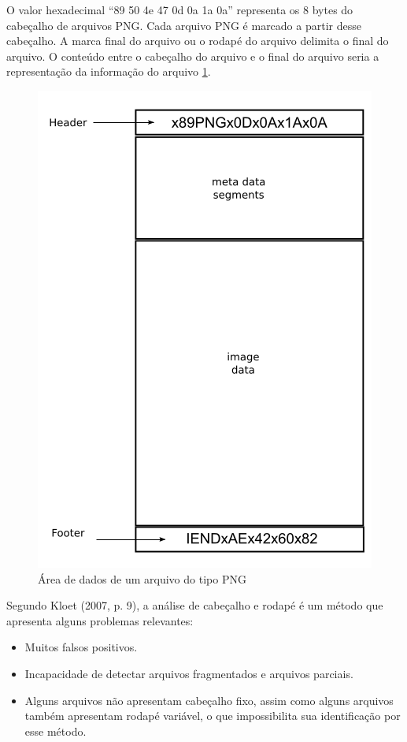 O valor hexadecimal ``89  50  4e  47  0d  0a  1a  0a'' representa os 8 bytes do cabeçalho de arquivos PNG. Cada arquivo PNG é marcado a partir desse cabeçalho. A marca final do arquivo ou o rodapé do arquivo delimita o final do arquivo. O conteúdo entre o cabeçalho do arquivo e o final do arquivo seria a representação da informação do arquivo \ref{fig:png-file-structure-data}.

\begin{figure}[htp]
  \centering
  \includegraphics[scale=0.6]{figuras/png-file-structure-data.png}
  \caption{Área de dados de um arquivo do tipo PNG \cite{Kloet}}
  \label{fig:png-file-structure-data}
\end{figure}

Segundo Kloet (2007, p. 9), a análise de cabeçalho e rodapé é um método que apresenta alguns problemas relevantes:

\begin{itemize}
 \item Muitos falsos positivos.
 \item Incapacidade de detectar arquivos fragmentados e arquivos parciais.
 \item Alguns arquivos não apresentam cabeçalho fixo, assim como alguns arquivos também apresentam rodapé variável, o que impossibilita sua identificação por esse método.
\end{itemize}

